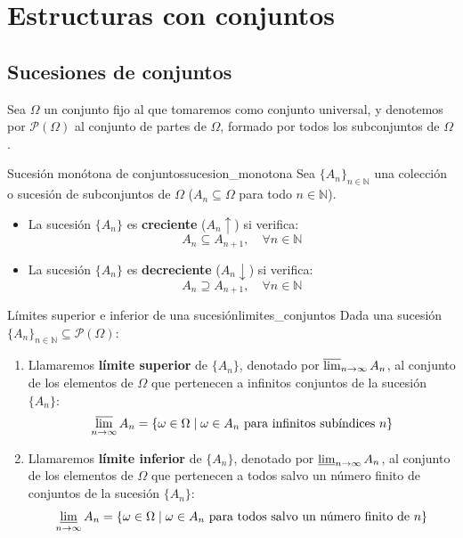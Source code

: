 \chapter{Estructuras con conjuntos}

\section{Sucesiones de conjuntos}

Sea $\Omega$ un conjunto fijo al que tomaremos como conjunto universal, y denotemos por $\mathcal{P}(\Omega)$ al conjunto de partes de $\Omega$, formado por todos los subconjuntos de $\Omega$.

\begin{definicion}{Sucesión monótona de conjuntos}{sucesion_monotona}
Sea $\{A_n\}_{n \in \mathbb{N}}$ una colección o sucesión de subconjuntos de $\Omega$ ($A_n \subseteq \Omega$ para todo $n \in \mathbb{N}$).
\begin{itemize}
    \item La sucesión $\{A_n\}$ es \textbf{creciente} ($A_n \uparrow$) si verifica:
    \[
        A_n \subseteq A_{n+1}, \quad \forall n \in \mathbb{N}
    \]
    \item La sucesión $\{A_n\}$ es \textbf{decreciente} ($A_n \downarrow$) si verifica:
    \[
        A_n \supseteq A_{n+1}, \quad \forall n \in \mathbb{N}
    \]
\end{itemize}
\end{definicion}

\begin{definicion}{Límites superior e inferior de una sucesión}{limites_conjuntos}
Dada una sucesión $\{A_n\}_{n \in \mathbb{N}} \subseteq \mathcal{P}(\Omega)$:
\begin{enumerate}
    \item Llamaremos \textbf{límite superior} de $\{A_n\}$, denotado por $\varlimsup_{n \to \infty} A_n$, al conjunto de los elementos de $\Omega$ que pertenecen a infinitos conjuntos de la sucesión $\{A_n\}$:
    \[
        \varlimsup_{n \to \infty} A_n = \{ \omega \in \Omega \mid \omega \in A_n \text{ para infinitos subíndices } n \}
    \]
    \item Llamaremos \textbf{límite inferior} de $\{A_n\}$, denotado por $\varliminf_{n \to \infty} A_n$, al conjunto de los elementos de $\Omega$ que pertenecen a todos salvo un número finito de conjuntos de la sucesión $\{A_n\}$:
    \[
        \varliminf_{n \to \infty} A_n = \{ \omega \in \Omega \mid \omega \in A_n \text{ para todos salvo un número finito de } n \}
    \]
\end{enumerate}
\end{definicion}

